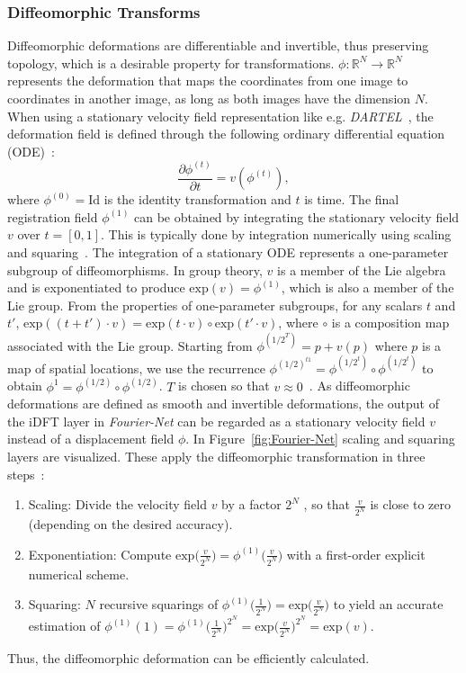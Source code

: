 \subsubsection{Diffeomorphic Transforms} \label{SubSubSec:DiffeomorphicTransforms}
Diffeomorphic deformations are differentiable and invertible, thus preserving topology, which is a desirable property for transformations. $\phi: \mathbb{R}^N \rightarrow \mathbb{R}^N$ represents the deformation that maps the coordinates from one image to coordinates in another image, as long as both images have the dimension $N$. When using a stationary velocity field representation like e.g. \emph{DARTEL}~\cite{DARTEL}, the deformation field is defined through the following ordinary differential equation (ODE)~\cite{Dalca2018}:
\begin{equation}
	\frac{\partial \phi^{(t)}}{\partial t} = v(\phi^{(t)}),
\end{equation}
where $\phi^{(0)} = \text{Id}$ is the identity transformation and $t$ is time. The final registration field $\phi^{(1)}$ can be obtained by integrating the stationary velocity field $v$ over $t = [0, 1]$. This is typically done by integration numerically using scaling and squaring~\cite{ScaleAndSquare}. The integration of a stationary ODE represents a one-parameter subgroup of diffeomorphisms. In group theory, $v$ is a member of the Lie algebra and is exponentiated to produce $\text{exp}(v) = \phi^{(1)}$, which is also a member of the Lie group. From the properties of one-parameter subgroups, for any scalars $t$ and $t'$, $\text{exp}((t + t') \cdot v) = \text{exp}(t \cdot v) \circ \text{exp}(t' \cdot v)$, where $\circ$ is a composition map associated with the Lie group. Starting from $\phi^{({1/2}^T)} = p + v(p)$ where $p$ is a map of spatial locations, we use the recurrence $\phi^{({1/2})^{t  1}} = \phi^{({1/2}^t)} \circ \phi^{({1/2}^t)}$ to obtain $\phi^1 = \phi^{(1/2)} \circ \phi^{(1/2)}$. $T$ is chosen so that $v \approx 0$~\cite{Dalca2018}. As diffeomorphic deformations are defined as smooth and invertible deformations, the output of the iDFT layer in \emph{Fourier-Net} can be regarded as a stationary velocity field $v$ instead of a displacement field $\phi$. In Figure~\ref{fig:Fourier-Net} scaling and squaring layers are visualized. These apply the diffeomorphic transformation in three steps~\cite{ScaleAndSquare}:
\begin{enumerate}
	\item Scaling: Divide the velocity field $v$ by a factor $2^N$ , so that $\frac{v}{2^N}$ is close to zero (depending on the desired accuracy).
	\item Exponentiation: Compute $\text{exp}\big(\frac{v}{2^N}\big) = \phi^{(1)}\big(\frac{v}{2^N}\big)$ with a first-order explicit numerical scheme.
	\item Squaring: $N$ recursive squarings of $\phi^{(1)}\big(\frac{1}{2^N}\big) = \text{exp}\big(\frac{v}{2^N}\big)$ to yield an accurate estimation of $\phi^{(1)}(1) = \phi^{(1)}\big(\frac{1}{2^N}\big)^{2^N} = \text{exp}\big(\frac{v}{2^N}\big)^{2^N} = \text{exp}(v)$.
\end{enumerate}
Thus, the diffeomorphic deformation can be efficiently calculated.


